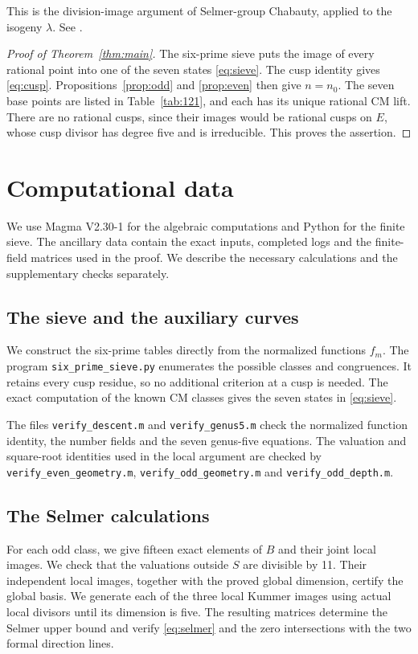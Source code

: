 \documentclass[11pt,reqno]{amsart}
\theoremstyle{definition}\newtheorem{definition}[theorem]{Definition}
\theoremstyle{remark}\newtheorem{remark}[theorem]{Remark}
\numberwithin{equation}{section}
\begin{document}
This is the division-image argument of Selmer-group Chabauty,
applied to the isogeny \(\lambda\). See
\cite[Theorem~2.1 and Remark~2.2]{Stoll}.


\begin{proof}[Proof of Theorem~\ref{thm:main}]
The six-prime sieve puts the image of every rational point into one
of the seven states \eqref{eq:sieve}. The cusp identity gives
\eqref{eq:cusp}. Propositions~\ref{prop:odd} and \ref{prop:even}
then give \(n=n_0\). The seven base points are listed in
Table~\ref{tab:121}, and each has its unique rational CM lift.
There are no rational cusps, since their images would be rational
cusps on \(E\), whose cusp divisor has degree five and is irreducible.
This proves the assertion.
\end{proof}

\section{Computational data}\label{sec:computations}

We use Magma V2.30-1 \cite{Magma} for the algebraic computations
and Python for the finite sieve. The ancillary data contain the
exact inputs, completed logs and the finite-field matrices used
in the proof. We describe the necessary calculations and the
supplementary checks separately.

\subsection{The sieve and the auxiliary curves}
We construct the six-prime tables directly from the normalized
functions \(f_m\). The program \texttt{six\_prime\_sieve.py}
enumerates the possible classes and congruences. It retains every
cusp residue, so no additional criterion at a cusp is needed.
The exact computation of the known CM classes gives the seven
states in \eqref{eq:sieve}.

The files \texttt{verify\_descent.m} and
\texttt{verify\_genus5.m} check the normalized function identity,
the number fields and the seven genus-five equations. The
valuation and square-root identities used in the local argument
are checked by \texttt{verify\_even\_geometry.m},
\texttt{verify\_odd\_geometry.m} and
\texttt{verify\_odd\_depth.m}.

\subsection{The Selmer calculations}
For each odd class, we give fifteen exact elements of \(B\)
and their joint local images. We check that the valuations
outside \(S\) are divisible by 11. Their independent local
images, together with the proved global dimension, certify the
global basis. We generate each of the three local Kummer images
using actual local divisors until its dimension is five. The
resulting matrices determine the Selmer upper bound and verify
\eqref{eq:selmer} and the zero intersections with the two formal
direction lines.
\end{document}
